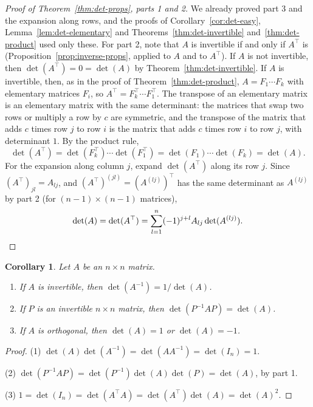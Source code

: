 \documentclass[11pt]{article}
\theoremstyle{definition}
\theoremstyle{plain}
\newtheorem{corollary}[definition]{Corollary}
\theoremstyle{remark}
\begin{document}
\begin{proof}[Proof of Theorem~\ref{thm:det-props}, parts 1 and 2]
    We already proved part 3 and the expansion along rows, and the proofs of Corollary~\ref{cor:det-easy}, Lemma~\ref{lem:det-elementary} and Theorems~\ref{thm:det-invertible} and~\ref{thm:det-product} used only these. For part 2, note that $A$ is invertible if and only if $A^\top$ is (Proposition~\ref{prop:inverse-props}, applied to $A$ and to $A^\top$). If $A$ is not invertible, then $\det(A^\top) = 0 = \det(A)$ by Theorem~\ref{thm:det-invertible}. If $A$ is invertible, then, as in the proof of Theorem~\ref{thm:det-product}, $A = F_1 \cdots F_k$ with elementary matrices $F_i$, so $A^\top = F_k^\top \cdots F_1^\top$. The transpose of an elementary matrix is an elementary matrix with the same determinant: the matrices that swap two rows or multiply a row by $c$ are symmetric, and the transpose of the matrix that adds $c$ times row $j$ to row $i$ is the matrix that adds $c$ times row $i$ to row $j$, with determinant $1$. By the product rule,
    \[\det(A^\top) = \det(F_k^\top) \cdots \det(F_1^\top) = \det(F_1) \cdots \det(F_k) = \det(A).\]
    For the expansion along column $j$, expand $\det(A^\top)$ along its row $j$. Since $(A^\top)_{jl} = A_{lj}$, and $(A^\top)^{(jl)} = (A^{(lj)})^\top$ has the same determinant as $A^{(lj)}$ by part 2 (for $(n-1) \times (n-1)$ matrices),
    \[\det(A) = \det(A^\top) = \sum_{l=1}^n (-1)^{j+l} A_{lj}\det(A^{(lj)}). \qedhere\]
\end{proof}

\begin{corollary}\label{cor:det-consequences}
    Let $A$ be an $n \times n$ matrix.
    \begin{enumerate}
        \item If $A$ is invertible, then $\det(A^{-1}) = 1/\det(A)$.
        \item If $P$ is an invertible $n \times n$ matrix, then $\det(P^{-1}AP) = \det(A)$.
        \item If $A$ is orthogonal, then $\det(A) = 1$ or $\det(A) = -1$.
    \end{enumerate}
\end{corollary}

\begin{proof}
    (1) $\det(A) \det(A^{-1}) = \det(AA^{-1}) = \det(I_n) = 1$.

    (2) $\det(P^{-1}AP) = \det(P^{-1}) \det(A) \det(P) = \det(A)$, by part 1.

    (3) $1 = \det(I_n) = \det(A^\top A) = \det(A^\top) \det(A) = \det(A)^2$.
\end{proof}
\end{document}
